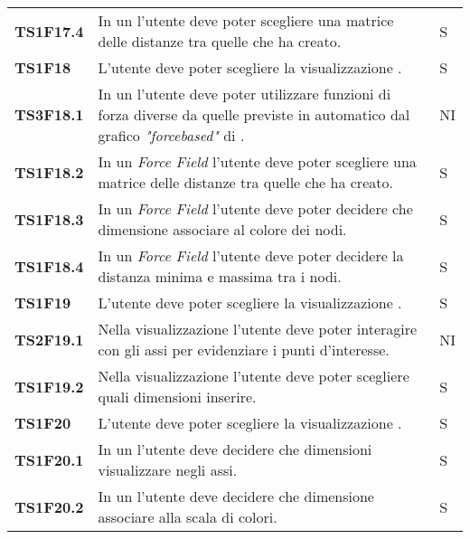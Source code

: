 {\begin{longtable}{ C{2cm} | C{12cm}| C{1.5cm} }
\textbf{TS1F17.4} & 
In un  l'utente deve poter scegliere una matrice delle distanze tra quelle che ha creato. & 
S\\

\textbf{TS1F18} & 
L'utente deve poter scegliere la visualizzazione . & 
S\\

\textbf{TS3F18.1} & 
In un  l'utente deve poter utilizzare funzioni di forza diverse da quelle previste in automatico dal grafico \textit{"forcebased"} di . & 
NI\\

\textbf{TS1F18.2} & 
In un \textit{Force Field} l'utente deve poter scegliere una matrice delle distanze tra quelle che ha creato. & 
S\\

\textbf{TS1F18.3} & 
In un \textit{Force Field} l'utente deve poter decidere che dimensione
associare al colore dei nodi. & 
S\\

\textbf{TS1F18.4} & 
In un \textit{Force Field} l'utente deve poter decidere la distanza minima e
massima tra i nodi. & 
S\\

\textbf{TS1F19} & 
L'utente deve poter scegliere la visualizzazione . & 
S\\

\textbf{TS2F19.1} & 
Nella visualizzazione  l'utente deve poter interagire con gli assi per evidenziare i punti d'interesse. & 
NI\\

\textbf{TS1F19.2} & 
Nella visualizzazione  l'utente deve poter scegliere quali dimensioni inserire. & 
S\\

\textbf{TS1F20} & 
L'utente deve poter scegliere la visualizzazione . & 
S\\

\textbf{TS1F20.1} & 
In un  l'utente deve decidere che dimensioni
visualizzare negli assi. & 
S\\

\textbf{TS1F20.2} & 
In un  l'utente deve decidere che dimensione
associare alla scala di colori. & 
S\\


\end{longtable}}

